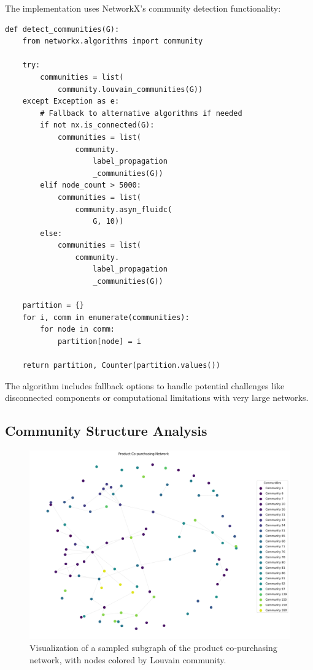 \documentclass[conference]{IEEEtran}
\begin{document}
The implementation uses NetworkX's community detection functionality:

\begin{lstlisting}
def detect_communities(G):
    from networkx.algorithms import community
    
    try:
        communities = list(
            community.louvain_communities(G))
    except Exception as e:
        # Fallback to alternative algorithms if needed
        if not nx.is_connected(G):
            communities = list(
                community.
                    label_propagation
                    _communities(G))
        elif node_count > 5000:
            communities = list(
                community.asyn_fluidc(
                    G, 10))
        else:
            communities = list(
                community.
                    label_propagation
                    _communities(G))
    
    partition = {}
    for i, comm in enumerate(communities):
        for node in comm:
            partition[node] = i
            
    return partition, Counter(partition.values())
\end{lstlisting}

The algorithm includes fallback options to handle potential challenges like disconnected components or computational limitations with very large networks.

\subsection{Community Structure Analysis}
\begin{figure}[H]
    \centering
    \includegraphics[width=\columnwidth]{fig/copurchase_graph.png}
    \caption{Visualization of a sampled subgraph of the product co‐purchasing network, with nodes colored by Louvain community.}
    \label{fig:copurchase_graph}
\end{figure}
\end{document}

